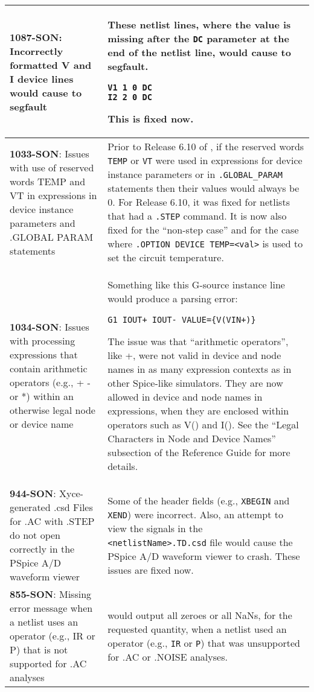 {\begin{longtable}[h] {>{\raggedright\small}m{2in}|>{\raggedright\let\\\tabularnewline\small}m{3.5in}}
\textbf{1087-SON}: Incorrectly formatted V and I device lines would cause \Xyce{} to segfault  &
 These netlist lines, where the value is missing after the \texttt{DC}
 parameter at the end of the netlist line, would cause \Xyce{} to
 segfault.
\begin{verbatim}
V1 1 0 DC
I2 2 0 DC
\end{verbatim}
This is fixed now.  \\ \hline

\textbf{1033-SON}: Issues with use of reserved words TEMP and VT in expressions
in device instance parameters and .GLOBAL PARAM statements & Prior to Release 6.10
of \Xyce{}, if the reserved words \texttt{TEMP} or \texttt{VT} were used in
expressions for device instance parameters or in \texttt{.GLOBAL\_PARAM}
statements then their values would always be 0.  For Release 6.10, it was fixed
for netlists that had a \texttt{.STEP} command.  It is now also fixed for the
``non-step case'' and for the case where \texttt{.OPTION DEVICE TEMP=<val>}
is used to set the circuit temperature.
\\ \hline

\textbf{1034-SON}: Issues with processing expressions that contain arithmetic
operators (e.g., + - or *) within an otherwise legal node or device name &
Something like this G-source instance line would produce a parsing error:
\begin{verbatim}
G1 IOUT+ IOUT- VALUE={V(VIN+)}
\end{verbatim}
The issue was that ``arithmetic operators'', like +, were not valid in device and
node names in as many expression contexts as in other Spice-like simulators.  They are now
allowed in device and node names in expressions, when they are enclosed within \Xyce{} 
operators such as V() and I().  See the ``Legal Characters in Node
and Device Names'' subsection of the \Xyce{} Reference Guide for more details.
\\ \hline

\textbf{944-SON}: Xyce-generated .csd Files for .AC with .STEP do not 
open correctly in the PSpice A/D waveform viewer &  Some of the header 
fields (e.g., \texttt{XBEGIN} and \texttt{XEND}) were incorrect.  Also, an 
attempt to view the signals in the \texttt{<netlistName>.TD.csd} file would 
cause the PSpice A/D waveform viewer to crash.  These issues are fixed now.  
\\ \hline

\textbf{855-SON}: Missing error message when a netlist uses an operator (e.g.,
IR or P) that is not supported for .AC analyses &  \Xyce{} would output all
zeroes or all NaNs, for the requested quantity, when a netlist used an operator (e.g.,
\texttt{IR} or \texttt{P}) that was unsupported for .AC or .NOISE analyses.


\end{longtable}}
